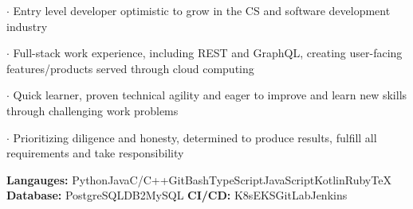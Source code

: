 \documentclass[8pt]{developercv} %
\begin{document}
\vspace{0.5cm}



\begin{minipage}[t]{\textwidth}
	\vspace{-\baselineskip} %
	
	$\cdot$ Entry level developer optimistic to grow in the CS and software development industry

	$\cdot$ Full-stack work experience, including REST and GraphQL, creating user-facing features/products served through cloud computing
	
	$\cdot$ Quick learner, proven technical agility and eager to improve and learn new skills through challenging work problems
	
	$\cdot$ Prioritizing diligence and honesty, determined to produce results, fulfill all requirements and take responsibility

\end{minipage}



\begin{minipage}[t]{\textwidth}
	\vspace{-\baselineskip} %

	\textbf{Langauges:} Python\slashsep Java\slashsep C/C++\slashsep GitBash\slashsep TypeScript\slashsep JavaScript\slashsep Kotlin\slashsep Ruby\slashsep TeX\\
	\textbf{Database:} PostgreSQL\slashsep DB2\slashsep MySQL \hfill \textbf{CI/CD: } K8s\slashsep EKS\slashsep GitLab\slashsep Jenkins
\end{minipage}



\end{document}
